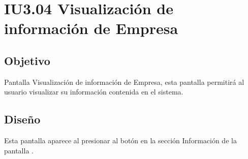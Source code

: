 \newpage
\section{IU3.04 Visualización de información de Empresa}

\subsection{Objetivo}
	Pantalla Visualización de información de Empresa, esta pantalla permitirá al usuario visualizar su información contenida en el sistema.
	


\subsection{Diseño}
	Esta pantalla aparece al presionar al botón  en la sección Información de la pantalla .

	
